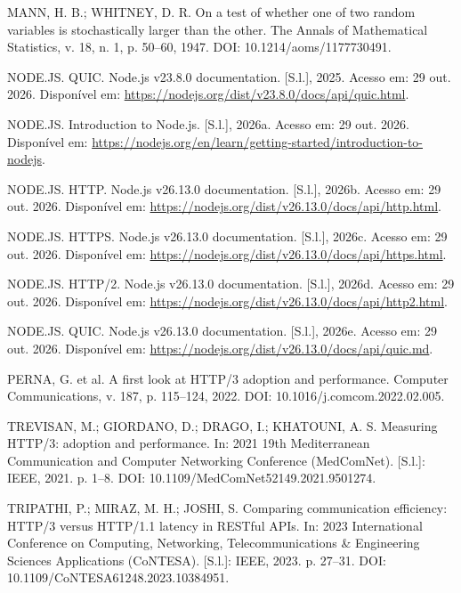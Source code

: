 MANN, H. B.; WHITNEY, D. R. On a test of whether one of two random variables is stochastically larger than the other. The Annals of Mathematical Statistics, v. 18, n. 1, p. 50--60, 1947. DOI: 10.1214/aoms/1177730491.



NODE.JS. QUIC. Node.js v23.8.0 documentation. [S.l.], 2025. Acesso em: 29 out. 2026. Disponível em: \url{https://nodejs.org/dist/v23.8.0/docs/api/quic.html}.



NODE.JS. Introduction to Node.js. [S.l.], 2026a. Acesso em: 29 out. 2026. Disponível em: \url{https://nodejs.org/en/learn/getting-started/introduction-to-nodejs}.



NODE.JS. HTTP. Node.js v26.13.0 documentation. [S.l.], 2026b. Acesso em: 29 out. 2026. Disponível em: \url{https://nodejs.org/dist/v26.13.0/docs/api/http.html}.



NODE.JS. HTTPS. Node.js v26.13.0 documentation. [S.l.], 2026c. Acesso em: 29 out. 2026. Disponível em: \url{https://nodejs.org/dist/v26.13.0/docs/api/https.html}.



NODE.JS. HTTP/2. Node.js v26.13.0 documentation. [S.l.], 2026d. Acesso em: 29 out. 2026. Disponível em: \url{https://nodejs.org/dist/v26.13.0/docs/api/http2.html}.



NODE.JS. QUIC. Node.js v26.13.0 documentation. [S.l.], 2026e. Acesso em: 29 out. 2026. Disponível em: \url{https://nodejs.org/dist/v26.13.0/docs/api/quic.md}.



PERNA, G. et al. A first look at HTTP/3 adoption and performance. Computer Communications, v. 187, p. 115--124, 2022. DOI: 10.1016/j.comcom.2022.02.005.



\begin{sloppypar}
TREVISAN, M.; GIORDANO, D.; DRAGO, I.; KHATOUNI, A. S. Measuring HTTP/3: adoption and performance. In: 2021 19th Mediterranean Communication and Computer Networking Conference (MedComNet). [S.l.]: IEEE, 2021. p. 1--8. DOI: 10.1109/MedComNet52149.2021.9501274.
\end{sloppypar}



TRIPATHI, P.; MIRAZ, M. H.; JOSHI, S. Comparing communication efficiency: HTTP/3 versus HTTP/1.1 latency in RESTful APIs. In: 2023 International Conference on Computing, Networking, Telecommunications \& Engineering Sciences Applications (CoNTESA). [S.l.]: IEEE, 2023. p. 27--31. DOI: 10.1109/CoNTESA61248.2023.10384951.



